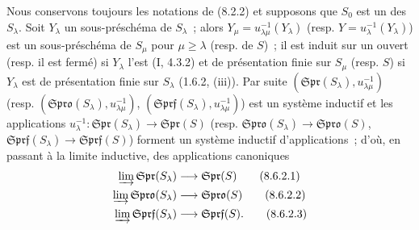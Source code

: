 \begin{env}[8.6.2]
\label{IV.8.6.2-fr}
Nous conservons toujours les notations de (8.2.2) et supposons que $S_0$ est
un des $S_\lambda$. Soit $Y_\lambda$ un sous-préschéma de $S_\lambda$~; alors
$Y_\mu=u_{\lambda\mu}^{-1}(Y_\lambda)$ (resp.
$Y=u_\lambda^{-1}(Y_\lambda)$) est un sous-préschéma de $S_\mu$ pour
$\mu\geq\lambda$ (resp. de $S$)~; il est induit sur un ouvert (resp. il est
fermé) si $Y_\lambda$ l'est (I, 4.3.2) et de présentation finie sur $S_\mu$
(resp. $S$) si $Y_\lambda$ est de présentation finie sur $S_\lambda$
(1.6.2, (iii)). Par suite
$(\mathfrak{Spr}(S_\lambda),u_{\lambda\mu}^{-1})$ (resp.
$(\mathfrak{Spro}(S_\lambda),u_{\lambda\mu}^{-1})$,
$(\mathfrak{Sprf}(S_\lambda),u_{\lambda\mu}^{-1})$) est un système inductif et
les applications
$u_\lambda^{-1}:\mathfrak{Spr}(S_\lambda)\to\mathfrak{Spr}(S)$ (resp.
$\mathfrak{Spro}(S_\lambda)\to\mathfrak{Spro}(S)$,
$\mathfrak{Sprf}(S_\lambda)\to\mathfrak{Sprf}(S)$) forment un système inductif
d'applications~; d'où, en passant à la limite inductive, des applications
canoniques
\begin{align}
  \varinjlim\mathfrak{Spr}(S_\lambda)
    &\longrightarrow\mathfrak{Spr}(S)
    \tag{8.6.2.1}\label{IV.8.6.2.1-fr}\\
  \varinjlim\mathfrak{Spro}(S_\lambda)
    &\longrightarrow\mathfrak{Spro}(S)
    \tag{8.6.2.2}\label{IV.8.6.2.2-fr}\\
  \varinjlim\mathfrak{Sprf}(S_\lambda)
    &\longrightarrow\mathfrak{Sprf}(S).
    \tag{8.6.2.3}\label{IV.8.6.2.3-fr}
\end{align}
\end{env}

